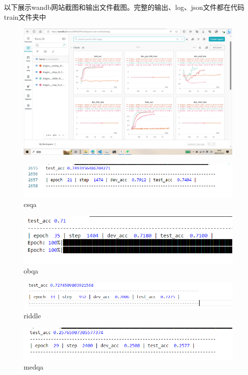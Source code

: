 以下展示wandb网站截图和输出文件截图。完整的输出、log、json文件都在代码train文件夹中
\begin{figure}[H]
  \centering
  \includegraphics[width=\textwidth]{figure/5.png}
  \caption{}
  \label{fig:my_label}
\end{figure}
\begin{figure}[H]
  \centering
  \includegraphics[width=\textwidth]{figure/csqa.png}
  \caption{csqa}
  \label{fig:my_label}
\end{figure}
\begin{figure}[H]
  \centering
  \includegraphics[width=\textwidth]{figure/obqa.png}
  \caption{obqa}
  \label{fig:my_label}
\end{figure}
\begin{figure}[H]
  \centering
  \includegraphics[width=\textwidth]{figure/riddle.png}
  \caption{riddle}
  \label{fig:my_label}
\end{figure}
\begin{figure}[H]
  \centering
  \includegraphics[width=\textwidth]{figure/medqa.png}
  \caption{medqa}
  \label{fig:my_label}
\end{figure}


